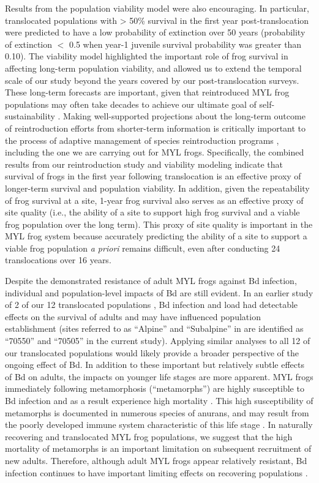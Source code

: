 \documentclass[9pt,twocolumn,twoside,lineno]{pnas-new}
\begin{document}
Results from the population viability model were also encouraging. In
particular, translocated populations with \textgreater{} 50\% survival
in the first year post-translocation were predicted to have a low
probability of extinction over 50 years (probability of extinction \(<\)
0.5 when year-1 juvenile survival probability was greater than 0.10).
The viability model highlighted the important role of frog survival in
affecting long-term population viability, and allowed us to extend the
temporal scale of our study beyond the years covered by our
post-translocation surveys. These long-term forecasts are important,
given that reintroduced MYL frog populations may often take decades to
achieve our ultimate goal of self-sustainability \citep{joseph2018}.
Making well-supported projections about the long-term outcome of
reintroduction efforts from shorter-term information is critically
important to the process of adaptive management of species
reintroduction programs \citep{seddon2007}, including the one we are
carrying out for MYL frogs. Specifically, the combined results from our
reintroduction study and viability modeling indicate that survival of
frogs in the first year following translocation is an effective proxy of
longer-term survival and population viability. In addition, given the
repeatability of frog survival at a site, 1-year frog survival also
serves as an effective proxy of site quality (i.e., the ability of a
site to support high frog survival and a viable frog population over the
long term). This proxy of site quality is important in the MYL frog
system because accurately predicting the ability of a site to support a
viable frog population \emph{a priori} remains difficult, even after
conducting 24 translocations over 16 years.

Despite the demonstrated resistance of adult MYL frogs against Bd
infection, individual and population-level impacts of Bd are still
evident. In an earlier study of 2 of our 12 translocated populations
\citep{joseph2018}, Bd infection and load had detectable effects on the
survival of adults and may have influenced population establishment
(sites referred to as ``Alpine'' and ``Subalpine'' in \citep{joseph2018}
are identified as ``70550'' and ``70505'' in the current study).
Applying similar analyses to all 12 of our translocated populations
would likely provide a broader perspective of the ongoing effect of Bd.
In addition to these important but relatively subtle effects of Bd on
adults, the impacts on younger life stages are more apparent. MYL frogs
immediately following metamorphosis (``metamorphs'') are highly
susceptible to Bd infection \citep{ellison2019} and as a result
experience high mortality \citep{rachowicz2006}. This high
susceptibility of metamorphs is documented in numerous species of
anurans, and may result from the poorly developed immune system
characteristic of this life stage \citep{humphries2022}. In naturally
recovering and translocated MYL frog populations, we suggest that the
high mortality of metamorphs is an important limitation on subsequent
recruitment of new adults. Therefore, although adult MYL frogs appear
relatively resistant, Bd infection continues to have important limiting
effects on recovering populations \citep[see also][]{hollanders2022}.
\end{document}
